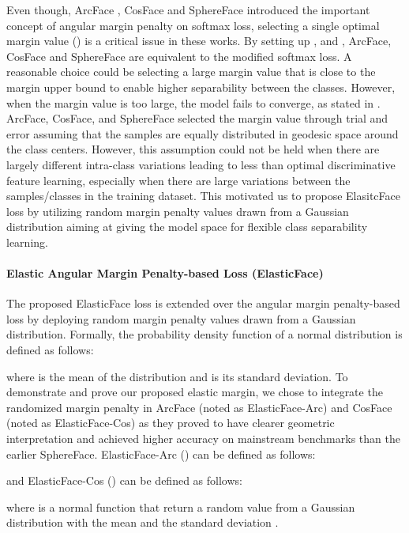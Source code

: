 \documentclass[letterpaper, 10 pt, conference]{ieeeconf}  \usepackage{times}
\begin{document}
Even though, ArcFace \cite{deng2019arcface}, CosFace \cite{DBLP:conf/cvpr/WangWZJGZL018} and SphereFace \cite{DBLP:conf/cvpr/LiuWYLRS17} introduced the important concept of angular margin penalty on softmax loss, selecting a single optimal margin value () is a critical issue in these works.
By setting up ,  and , ArcFace, CosFace and SphereFace are equivalent to the modified softmax loss. A reasonable choice could be selecting a large margin value that is close to the margin upper bound to enable higher separability between the classes.  However, when the margin value is too large, the model fails to converge, as stated in \cite{DBLP:conf/cvpr/WangWZJGZL018}.
ArcFace, CosFace, and SphereFace selected the margin value through trial and error assuming that the samples are equally distributed in geodesic space around the class centers. However, this assumption could not be held when there are largely different intra-class variations leading to less than optimal discriminative feature learning, especially when there are large variations between the samples/classes in the training dataset. This motivated us to propose ElasitcFace loss by utilizing random margin penalty values drawn from a Gaussian distribution aiming at giving the model space for flexible class separability learning.


\paragraph{Elastic Angular Margin Penalty-based Loss (ElasticFace)}
The proposed ElasticFace loss is extended over the angular margin penalty-based loss by deploying random margin penalty values drawn from a Gaussian distribution.
Formally, the probability density function of a normal distribution is defined as follows:

where  is the mean of the distribution and  is its standard deviation. To demonstrate and prove our proposed elastic margin, we chose to integrate the randomized margin penalty in ArcFace (noted as ElasticFace-Arc) and CosFace (noted as ElasticFace-Cos) as they proved to have clearer geometric interpretation and achieved higher accuracy on mainstream benchmarks than the earlier SphereFace.
ElasticFace-Arc () can be defined as follows:

and ElasticFace-Cos () can be defined as follows:

where  is a normal function that return a random value from a Gaussian distribution with the mean  and the standard deviation . 
\end{document}
